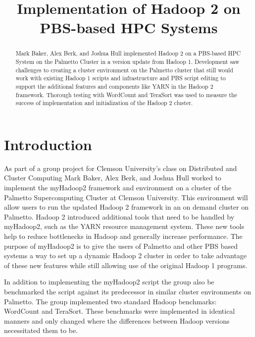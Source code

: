 \documentclass[conference]{IEEEtran}
\begin{document}
	\title{Implementation of Hadoop 2 on PBS-based HPC Systems}
	\author{
	}

	\maketitle

	\begin{abstract}
		Mark Baker, Alex Berk, and Joshua Hull implemented Hadoop 2 on a PBS-based HPC System on the Palmetto Cluster in a version update from Hadoop 1. Development saw challenges to creating a cluster environment on the Palmetto cluster that still would work with existing Hadoop 1 scripts and infrastructure and PBS script editing to support the additional features and components like YARN in the Hadoop 2 framework. Thorough testing with WordCount and TeraSort was used to measure the success of implementation and initialization of the Hadoop 2 cluster.
	\end{abstract}

	\section{Introduction}
		As part of a group project for Clemson University's class on Distributed and Cluster Computing Mark Baker, Alex Berk, and Joshua Hull worked to implement the myHadoop2 framework and environment on a cluster of the Palmetto Supercomputing Cluster at Clemson University. This environment will allow users to run the updated Hadoop 2 framework in an on demand cluster on Palmetto. Hadoop 2 introduced additional tools that need to be handled by myHadoop2, such as the YARN resource management system. These new tools help to reduce bottlenecks in Hadoop and generally increase performance. The purpose of myHadoop2 is to give the users of Palmetto and other PBS based systems a way to set up a dynamic Hadoop 2 cluster in order to take advantage of these new features while still allowing use of the original Hadoop 1 programs.

        In addition to implementing the myHadoop2 script the group also be benchmarked the script against its predecessor in similar cluster environments on Palmetto. The group implemented two standard Hadoop benchmarks: WordCount and TeraSort. These benchmarks were implemented in identical manners and only changed where the differences between Hadoop versions necessitated them to be.
\end{document}
